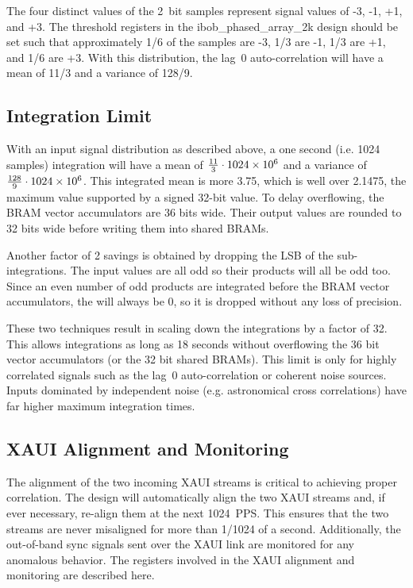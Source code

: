 \documentclass[12pt]{article}
\begin{document}
The four distinct values of the 2~bit samples represent signal values of -3,
-1, +1, and +3.  The threshold registers in the ibob\_phased\_array\_2k design
should be set such that approximately 1/6 of the samples are -3, 1/3 are -1,
1/3 are +1, and 1/6 are +3.  With this distribution, the lag~0 auto-correlation
will have a mean of 11/3 and a variance of 128/9.

\subsection{Integration Limit}

With an input signal distribution as described above, a one second (i.e.
1024 samples) integration will have a mean of $\frac{11}{3}\cdot1024\times 10^{6}$ and
a variance of $\frac{128}{9}\cdot1024\times 10^{6}$.  This integrated mean is more
3.75, which is well over 2.1475, the maximum value supported by a signed
32-bit value.  To delay overflowing, the BRAM vector accumulators are 36 bits
wide.  Their output values are rounded to 32 bits wide before writing them into
shared BRAMs.

Another factor of 2 savings is obtained by dropping the LSB of the
sub-integrations.  The input values are all odd so their products will all be
odd too.  Since an even number of odd products are integrated before the BRAM
vector accumulators, the \LSb will always be 0, so it is dropped without any
loss of precision.

These two techniques result in scaling down the integrations by a factor of 32.
This allows integrations as long as 18 seconds without overflowing the 36 bit
vector accumulators (or the 32 bit shared BRAMs).  This limit is only for
highly correlated signals such as the lag~0 auto-correlation or coherent noise
sources.  Inputs dominated by independent noise (e.g. astronomical cross
correlations) have far higher maximum integration times.

\subsection{XAUI Alignment and Monitoring}

The alignment of the two incoming XAUI streams is critical to achieving proper
correlation.  The design will automatically align the two XAUI streams and, if
ever necessary, re-align them at the next 1024~PPS.  This ensures that the two
streams are never misaligned for more than 1/1024 of a second.  Additionally,
the out-of-band sync signals sent over the XAUI link are monitored for any
anomalous behavior.  The registers involved in the XAUI alignment and
monitoring are described here.
\end{document}
